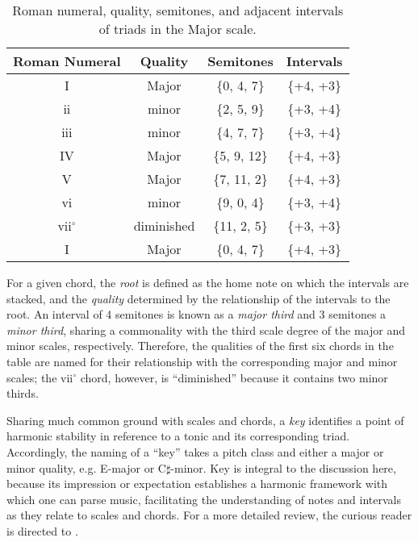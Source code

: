 \begin{table}[h!]
\begin{center}
\caption{Roman numeral, quality, semitones, and adjacent intervals of triads in the Major scale.}
\label{tab:major_triads}
\begin{tabular}{c | c | c | c }
Roman Numeral & Quality & Semitones & Intervals \\
\hline
I & Major & \{0, 4, 7\} & \{+4, +3\}\\
ii & minor & \{2, 5, 9\} & \{+3, +4\}\\
iii & minor & \{4, 7, 7\} & \{+3, +4\}\\
IV & Major & \{5, 9, 12\} & \{+4, +3\}\\
V & Major & \{7, 11, 2\} & \{+4, +3\}\\
vi & minor & \{9, 0, 4\} & \{+3, +4\}\\
vii$^\circ$ & diminished & \{11, 2, 5\} & \{+3, +3\}\\
I & Major & \{0, 4, 7\} & \{+4, +3\}\\
\hline
\end{tabular}
\end{center}
\end{table}

For a given chord, the \emph{root} is defined as the home note on which the intervals are stacked, and the \emph{quality} determined by the relationship of the intervals to the root.
An interval of 4 semitones is known as a \emph{major third} and 3 semitones a \emph{minor third}, sharing a commonality with the third scale degree of the major and minor scales, respectively.
Therefore, the qualities of the first six chords in the table are named for their relationship with the corresponding major and minor scales; the vii$^\circ$ chord, however, is ``diminished'' because it contains two minor thirds.

Sharing much common ground with scales and chords, a \emph{key} identifies a point of harmonic stability in reference to a tonic and its corresponding triad.
Accordingly, the naming of a ``key'' takes a pitch class and either a major or minor quality, e.g. E-major or C$\sharp$-minor.
Key is integral to the discussion here, because its impression or expectation establishes a harmonic framework with which one can parse music, facilitating the understanding of notes and intervals as they relate to scales and chords.
For a more detailed review, the curious reader is directed to \cite{SomeMusicBook}.


